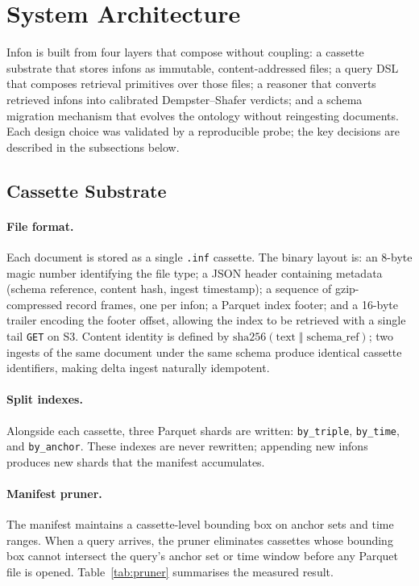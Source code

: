 \section{System Architecture}
\label{sec:architecture}

Infon is built from four layers that compose without coupling: a cassette
substrate that stores infons as immutable, content-addressed files; a query DSL
that composes retrieval primitives over those files; a reasoner that converts
retrieved infons into calibrated Dempster--Shafer verdicts; and a schema
migration mechanism that evolves the ontology without reingesting documents.
Each design choice was validated by a reproducible probe; the key decisions
are described in the subsections below.

\subsection{Cassette Substrate}
\label{sec:architecture:cassette}

\paragraph{File format.}
Each document is stored as a single \texttt{.inf} cassette.  The binary
layout is: an 8-byte magic number identifying the file type; a JSON header
containing metadata (schema reference, content hash, ingest timestamp); a
sequence of gzip-compressed record frames, one per infon; a Parquet index
footer; and a 16-byte trailer encoding the footer offset, allowing the index
to be retrieved with a single tail \texttt{GET} on S3.  Content identity is
defined by $\mathrm{sha256}(\text{text} \;\Vert\; \text{schema\_ref})$; two
ingests of the same document under the same schema produce identical cassette
identifiers, making delta ingest naturally idempotent.

\paragraph{Split indexes.}
Alongside each cassette, three Parquet shards are written:
\texttt{by\_triple}, \texttt{by\_time}, and \texttt{by\_anchor}.  These
indexes are never rewritten; appending new infons produces new shards that the
manifest accumulates.

\paragraph{Manifest pruner.}
The manifest maintains a cassette-level bounding box on anchor sets and time
ranges.  When a query arrives, the pruner eliminates cassettes whose bounding
box cannot intersect the query's anchor set or time window before any Parquet
file is opened.  Table~\ref{tab:pruner} summarises the measured result.

